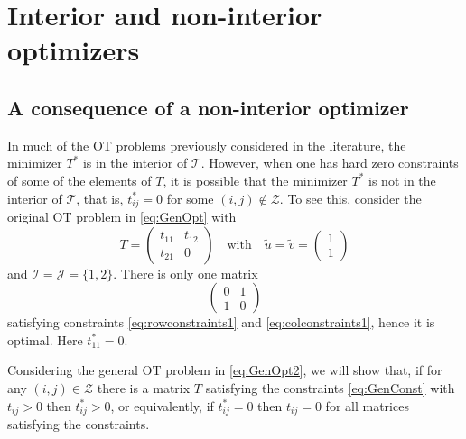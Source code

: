 \documentclass[twocolumn]{article}
\begin{document}
\section{Interior and non-interior optimizers}




\subsection{A consequence of a non-interior optimizer}
In much of the OT problems previously considered in the literature, the  minimizer $T^*$ is in the interior of ${\mathcal T}$.
However, when one has hard zero constraints of some of the elements of $T$,
it is possible that the minimizer $T^*$ is not in the interior of ${\mathcal T}$, that is, $t^*_{ij} =0$ for some $(i,j) \notin {\mathcal Z}$.
To see this, consider the original OT  problem in
\eqref{eq:GenOpt} with 
\begin{equation}
T=\left(\begin{array}{cc}
t_{11} & t_{12}\\
t_{21}& 0
\end{array}
\right)
\quad \mbox{with} \quad  \tilde{u} = \tilde{v} =\left(\begin{array}{c} 1\\ 1
\end{array}
\right)
\label{eq:exsimple2}
\end{equation}
and ${\mathcal I}= {\mathcal J} = \{1, 2\}$.
There is only one matrix
\[
\left(\begin{array}{cc}
0& 1\\
1& 0
\end{array}
\right)
\]
satisfying constraints  \eqref{eq:rowconstraints1} and \eqref{eq:colconstraints1}, hence it is optimal. Here $t^*_{11} = 0$.

Considering the general OT problem in \eqref{eq:GenOpt2}, we will show that, if for any $(i,j) \in {\mathcal Z}$ there is a matrix $T$ satisfying the constraints 
\eqref{eq:GenConst}
with $t_{ij} >0$ then $t^*_{ij}>0$, or equivalently, if $t^*_{ij}=0$ then $t_{ij} = 0$ for all matrices satisfying the constraints.
\end{document}

